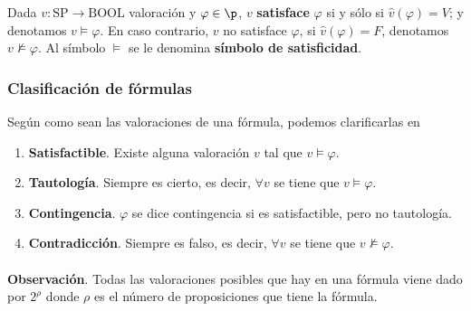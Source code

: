 \begin{definition} Dada $v: \mbox{SP} \rightarrow \mbox{BOOL}$ valoración y $\varphi \in \p$, $v$ \textbf{satisface} $\varphi$ si y sólo si $\widehat{v}(\varphi)=V$; y denotamos $v \models \varphi$. En caso contrario, $v$ no satisface $\varphi$, si $\widehat{v}(\varphi)=F$, denotamos $v \not\models \varphi$. Al símbolo $\models$ se le denomina \textbf{símbolo de satisficidad}.
\end{definition}

\subsubsection{Clasificación de fórmulas}
\begin{definition} Según como sean las valoraciones de una fórmula, podemos clarificarlas en
\begin{enumerate}
	\item \textbf{Satisfactible}. Existe alguna valoración $v$ tal que $v \models \varphi$.
	\item \textbf{Tautología}. Siempre es cierto, es decir, $\forall v$ se tiene que $v \models \varphi$.
	\item \textbf{Contingencia}. $\varphi$ se dice contingencia si es satisfactible, pero no tautología. 
	\item \textbf{Contradicción}. Siempre es falso, es decir, $\forall v$ se tiene que $v \not \models \varphi$.
\end{enumerate}
\end{definition}
\paragraph{}
\addtocounter{obs}{1} %
\textbf{Observación}. Todas las valoraciones posibles que hay en una fórmula viene dado por $2^{\rho}$ donde $\rho$ es el número de proposiciones que tiene la fórmula.